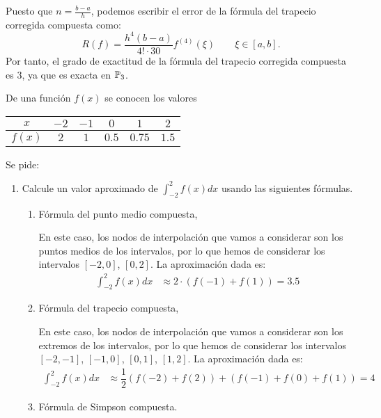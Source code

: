 \begin{ejercicio}
\begin{enumerate}
        Puesto que $n = \frac{b-a}{h}$, podemos escribir el error de la fórmula del trapecio corregida compuesta como:
        \begin{equation*}
            R(f) = \dfrac{h^4(b-a)}{4!\cdot 30} f^{(4)}(\xi)\qquad \xi \in [a, b].
        \end{equation*}
        Por tanto, el grado de exactitud de la fórmula del trapecio corregida compuesta es 3, ya que es exacta en $\mathbb{P}_3$.
    \end{enumerate}
\end{ejercicio}

\begin{ejercicio}\label{ej:2.1.17}
    De una función $f(x)$ se conocen los valores
    \begin{center}
        \begin{tabular}{c|c|c|c|c|c}
            $x$ & $-2$ & $-1$ & $0$ & $1$ & $2$ \\
            \hline
            $f(x)$ & $2$ & $1$ & $0.5$ & $0.75$ & $1.5$
        \end{tabular}
    \end{center}
    Se pide:
    \begin{enumerate}
        \item Calcule un valor aproximado de $\int_{-2}^{2} f(x) dx$ usando las siguientes fórmulas.
        \begin{enumerate}
            \item Fórmula del punto medio compuesta,
            
            En este caso, los nodos de interpolación que vamos a considerar son los puntos medios de los intervalos, por lo que hemos de considerar los intervalos $[-2, 0]$, $[0, 2]$. La aproximación dada es:
            \begin{align*}
                \int_{-2}^{2} f(x) dx &\approx 2\cdot \left(f(-1) + f(1)\right) = 3.5
            \end{align*}
            \item Fórmula del trapecio compuesta,
            
            En este caso, los nodos de interpolación que vamos a considerar son los extremos de los intervalos, por lo que hemos de considerar los intervalos $[-2, -1]$, $[-1, 0]$, $[0, 1]$, $[1, 2]$. La aproximación dada es:
            \begin{align*}
                \int_{-2}^{2} f(x) dx &\approx \dfrac{1}{2}\left(f(-2) + f(2)\right) + \left(f(-1) + f(0) + f(1)\right) = 4
            \end{align*}
            \item Fórmula de Simpson compuesta.
            

\end{enumerate}
\end{enumerate}
\end{ejercicio}
